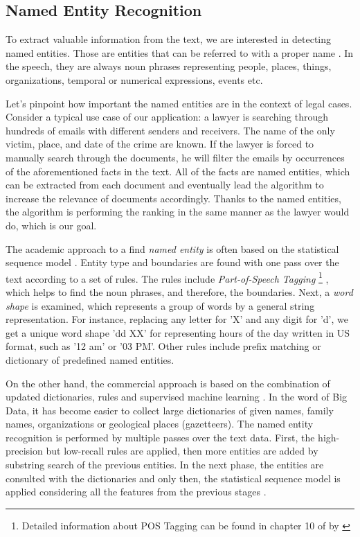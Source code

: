 \documentclass[
  digital, %
  table,   %
  lof,     %
  lot,     %
]{fithesis3}
\begin{document}
\subsection{Named Entity Recognition}
To extract valuable information from the text, we are interested in detecting named entities.
Those are entities that can be referred to with a proper name \cite[ch. 21]{jurafsky2014speech}.
In the speech, they are always noun phrases representing people, places, things, organizations, temporal or numerical expressions, events etc.

Let's pinpoint how important the named entities are in the context of legal cases.
Consider a typical use case of our application: a lawyer is searching through hundreds of emails with different senders and receivers.
The name of the only victim, place, and date of the crime are known.
If the lawyer is forced to manually search through the documents, he will filter the emails by occurrences of the aforementioned facts in the text.
All of the facts are named entities, which can be extracted from each document and eventually lead the algorithm to increase the relevance of documents accordingly.
Thanks to the named entities, the algorithm is performing the ranking in the same manner as the lawyer would do, which is our goal.

The academic approach to a find \textit{named entity} is often based on the statistical sequence model \cite[ch. 21]{jurafsky2014speech}.
Entity type and boundaries are found with one pass over the text according to a set of rules.
The rules include \textit{Part-of-Speech Tagging} 
\footnote{Detailed information about POS Tagging can be found in chapter 10 of  by \citeauthor{jurafsky2014speech} \cite{jurafsky2014speech}}
, which helps to find the noun phrases, and therefore, the boundaries.
Next, a \textit{word shape} is examined, which represents a group of words by a general string representation. 
For instance, replacing any letter for 'X' and any digit for 'd', we get a unique word shape 'dd XX' for representing hours of the day written in US format, such as '12 am' or '03 PM'. 
Other rules include prefix matching or dictionary of predefined named entities.

On the other hand, the commercial approach is based on the combination of updated dictionaries, rules and supervised machine learning \cite{chiticariu2013rule}.
In the word of Big Data, it has become easier to collect large dictionaries of given names, family names, organizations or geological places (gazetteers).
The named entity recognition is performed by multiple passes over the text data.
First, the high-precision but low-recall rules are applied, then more entities are added by substring search of the previous entities.
In the next phase, the entities are consulted with the dictionaries and only then, the statistical sequence model is applied considering all the features from the previous stages \cite[ch. 21]{jurafsky2014speech}.
\end{document}

